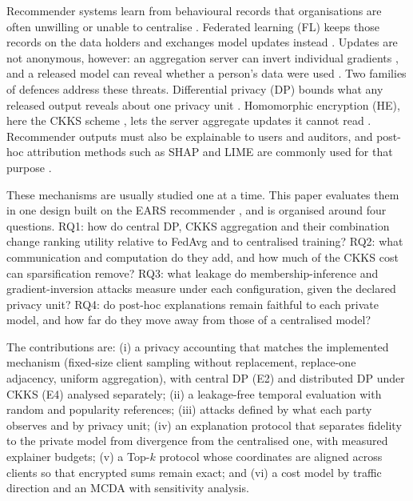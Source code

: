 \documentclass[11pt,a4paper]{article}
\begin{document}
Recommender systems learn from behavioural records that organisations are often unwilling or unable to centralise \cite{yang2019federated}. Federated learning (FL) keeps those records on the data holders and exchanges model updates instead \cite{mcmahan2017communication,kairouz2021advances}. Updates are not anonymous, however: an aggregation server can invert individual gradients \cite{zhu2019deep,geiping2020inverting}, and a released model can reveal whether a person's data were used \cite{yeom2018privacy,carlini2022membership}. Two families of defences address these threats. Differential privacy (DP) bounds what any released output reveals about one privacy unit \cite{dwork2014algorithmic,mcmahan2018learning}. Homomorphic encryption (HE), here the CKKS scheme \cite{cheon2017homomorphic}, lets the server aggregate updates it cannot read \cite{benaissa2021tenseal}. Recommender outputs must also be explainable to users and auditors, and post-hoc attribution methods such as SHAP and LIME \cite{lundberg2017unified,ribeiro2016why} are commonly used for that purpose \cite{ge2022explainable}.

These mechanisms are usually studied one at a time. This paper evaluates them in one design built on the EARS recommender \cite{gaspar2025ears}, and is organised around four questions. RQ1: how do central DP, CKKS aggregation and their combination change ranking utility relative to FedAvg and to centralised training? RQ2: what communication and computation do they add, and how much of the CKKS cost can sparsification remove? RQ3: what leakage do membership-inference and gradient-inversion attacks measure under each configuration, given the declared privacy unit? RQ4: do post-hoc explanations remain faithful to each private model, and how far do they move away from those of a centralised model?

The contributions are: (i) a privacy accounting that matches the implemented mechanism (fixed-size client sampling without replacement, replace-one adjacency, uniform aggregation), with central DP (E2) and distributed DP under CKKS (E4) analysed separately; (ii) a leakage-free temporal evaluation with random and popularity references; (iii) attacks defined by what each party observes and by privacy unit; (iv) an explanation protocol that separates fidelity to the private model from divergence from the centralised one, with measured explainer budgets; (v) a Top-$k$ protocol whose coordinates are aligned across clients so that encrypted sums remain exact; and (vi) a cost model by traffic direction and an MCDA with sensitivity analysis.
\end{document}
